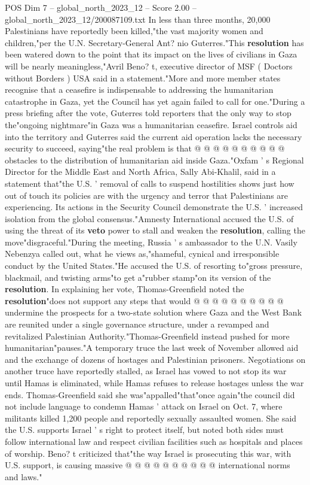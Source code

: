 \begin{textsample}{POS Dim 7 – global\_north\_2023\_12 – Score 2.00 – global\_north\_2023\_12/200087109.txt}
In less than three months, 20,000 Palestinians have reportedly been killed,"the vast majority women and children,"per the U.N.
Secretary-General Ant? nio Guterres."This \textbf{resolution} has been watered down to the point that its impact on the lives of civilians in Gaza will be nearly meaningless,"Avril Beno? t, executive director of MSF ( Doctors without Borders ) USA said in a statement."More and more member states recognise that a ceasefire is indispensable to addressing the humanitarian catastrophe in Gaza, yet the Council has yet again failed to call for one."During a press briefing after the vote, Guterres told reporters that the only way to stop the"ongoing nightmare"in Gaza was a humanitarian ceasefire.
Israel controls aid into the territory and Guterres said the current aid operation lacks the necessary security to succeed, saying"the real problem is that @ @ @ @ @ @ @ @ @ @ obstacles to the distribution of humanitarian aid inside Gaza."Oxfam ' s Regional Director for the Middle East and North Africa, Sally Abi-Khalil, said in a statement that"the U.S. ' removal of calls to suspend hostilities shows just how out of touch its policies are with the urgency and terror that Palestinians are experiencing.
Its actions in the Security Council demonstrate the U.S. ' increased isolation from the global consensus."Amnesty International accused the U.S. of using the threat of its \textbf{veto} power to stall and weaken the \textbf{resolution}, calling the move"disgraceful."During the meeting, Russia ' s ambassador to the U.N.
Vasily Nebenzya called out, what he views as,"shameful, cynical and irresponsible conduct by the United States."He accused the U.S. of resorting to"gross pressure, blackmail, and twisting arms"to get a"rubber stamp"on its version of the \textbf{resolution}.
In explaining her vote, Thomas-Greenfield noted the \textbf{resolution}"does not support any steps that would @ @ @ @ @ @ @ @ @ @ undermine the prospects for a two-state solution where Gaza and the West Bank are reunited under a single governance structure, under a revamped and revitalized Palestinian Authority."Thomas-Greenfield instead pushed for more humanitarian"pauses."A temporary truce the last week of November allowed aid and the exchange of dozens of hostages and Palestinian prisoners.
Negotiations on another truce have reportedly stalled, as Israel has vowed to not stop its war until Hamas is eliminated, while Hamas refuses to release hostages unless the war ends.
Thomas-Greenfield said she was"appalled"that"once again"the council did not include language to condemn Hamas ' attack on Israel on Oct. 7, where militants killed 1,200 people and reportedly sexually assaulted women.
She said the U.S. supports Israel ' s right to protect itself, but noted both sides must follow international law and respect civilian facilities such as hospitals and places of worship.
Beno? t criticized that"the way Israel is prosecuting this war, with U.S. support, is causing massive @ @ @ @ @ @ @ @ @ @ international norms and laws."

\end{textsample}

